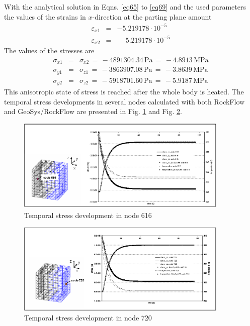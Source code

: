 With the analytical solution in Eqns. \ref{eq65} to \ref{eq69} and the used parameters the values of the strains in $x$-direction at the parting plane amount
\begin{eqnarray*}
\varepsilon_{x1} & = & -5.219178\cdot 10^{-5} \\[1.5ex]
\varepsilon_{x2} & = & \phantom{-}5.219178\cdot 10^{-5}
\end{eqnarray*}
The values of the stresses are
\begin{eqnarray*}
\sigma_{x1} & = & \sigma_{x2}\,=\,-4891304.34\,\mathrm{Pa}
                             \,=\,-4.8913\,\mathrm{MPa} \\[1.5ex]
\sigma_{y1} & = & \sigma_{z1}\,=\,-3863907.08\,\mathrm{Pa}
                             \,=\,-3.8639\,\mathrm{MPa} \\[1.5ex]
\sigma_{y2} & = & \sigma_{z2}\,=\,-5918701.60\,\mathrm{Pa}
                             \,=\,-5.9187\,\mathrm{MPa}
\end{eqnarray*}
This anisotropic state of stress is reached after the whole body is heated. The temporal stress developments in several nodes calculated with both RockFlow and \linebreak
GeoSys/RockFlow are presented in Fig. \ref{fig66} and Fig. \ref{fig67}.

\begin{figure}[htbp]
\centering
\includegraphics[width=0.9\textwidth]{TM/figures/fig66.eps}
\caption{Temporal stress development in node 616}
\label{fig66}
\end{figure}

\begin{figure}[htbp]
\centering
\includegraphics[width=0.9\textwidth]{TM/figures/fig67.eps}
\caption{Temporal stress development in node 720}
\label{fig67}
\end{figure}

